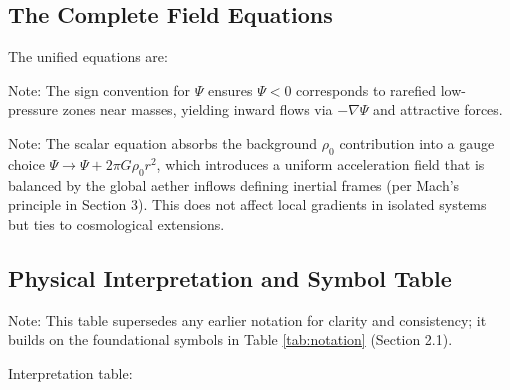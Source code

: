 \documentclass{article}
\begin{document}
\subsection{The Complete Field Equations}

The unified equations are:

\medskip
\noindent
\makebox[\linewidth][c]{%
\fbox{%
\begin{minipage}{\dimexpr\linewidth-2\fboxsep-2\fboxrule\relax}
\[
\frac{1}{v_{\text{eff}}^2} \frac{\partial^2 \Psi}{\partial t^2} - \nabla^2 \Psi = 4\pi G \rho_{\text{body}}(\mathbf{r}, t)
\]

\[
\frac{1}{c^2} \frac{\partial^2 \mathbf{A}}{\partial t^2} - \nabla^2 \mathbf{A} = -\frac{16\pi G}{c^2} \rho_{\text{body}}(\mathbf{r}, t) \mathbf{V}(\mathbf{r}, t)
\]

\[
\mathbf{a}(\mathbf{r}, t) = -\nabla \Psi + \xi \, \partial_t (\nabla \times \mathbf{A})
\]

\[
\mathbf{F} = m \left[ -\nabla \Psi - \partial_t \mathbf{A} + 4 \mathbf{v}_m \times (\nabla \times \mathbf{A}) \right]
\]
\end{minipage}
}
}
\medskip

Note: The sign convention for $\Psi$ ensures $\Psi < 0$ corresponds to rarefied low-pressure zones near masses, yielding inward flows via $-\nabla \Psi$ and attractive forces.

Note: The scalar equation absorbs the background $\rho_0$ contribution into a gauge choice $\Psi \to \Psi + 2\pi G \rho_0 r^2$, which introduces a uniform acceleration field that is balanced by the global aether inflows defining inertial frames (per Mach's principle in Section 3). This does not affect local gradients in isolated systems but ties to cosmological extensions.

\subsection{Physical Interpretation and Symbol Table}

Note: This table supersedes any earlier notation for clarity and consistency; it builds on the foundational symbols in Table \ref{tab:notation} (Section 2.1).

Interpretation table:
\end{document}
